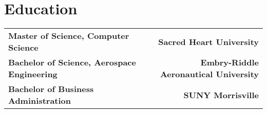 \section*{Education}
\noindent
\begin{tabularx}{\textwidth}{@{}Xr@{}}
    \textbf{Master of Science, Computer Science} & \textbf{Sacred Heart University} \\
    \textbf{Bachelor of Science, Aerospace Engineering} & \textbf{Embry-Riddle Aeronautical University} \\
    \textbf{Bachelor of Business Administration} & \textbf{SUNY Morrisville} \\
\end{tabularx}